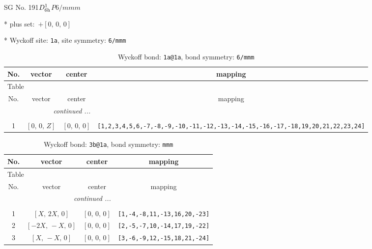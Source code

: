 \documentclass[fleqn,8pt]{jsarticle}
\begin{document}
\setcounter{MaxMatrixCols}{32}

\renewcommand{\tablename}{Table~}
\renewcommand{\figurename}{Figure~}
\begin{center}
\LARGE
SG No. 191\quad$D_{\rm 6h}^{1}$\quad$P6/mmm$\quad[ hexagonal ]
\end{center}

* plus set:\,\,\,$+\left[ 0,\, 0,\, 0 \right]$


* Wyckoff site: {\tt 1a}, site symmetry: {\tt 6/mmm}
\renewcommand{\arraystretch}{1.2}
\begin{longtable}{cccc}
\caption{Wyckoff bond: {\tt 1a@1a}, bond symmetry: {\tt 6/mmm}}
 \\
 \hline \hline
No. & vector & center & mapping \\ \hline \endfirsthead

\multicolumn{3}{l}{\tablename\ \thetable{}} \\
 \hline \hline
No. & vector & center & mapping \\ \hline \endhead

 \hline \hline
\multicolumn{3}{r}{\footnotesize\it continued ...} \\ \endfoot

 \hline \hline
\multicolumn{3}{r}{} \\ \endlastfoot

1 & $\left[ 0,\, 0,\, Z \right]$ & $\left[ 0,\, 0,\, 0 \right]$ & {\tt [1,2,3,4,5,6,-7,-8,-9,-10,-11,-12,-13,-14,-15,-16,-17,-18,19,20,21,22,23,24]} \\
\end{longtable}
\renewcommand{\arraystretch}{1.2}
\begin{longtable}{cccc}
\caption{Wyckoff bond: {\tt 3b@1a}, bond symmetry: {\tt mmm}}
 \\
 \hline \hline
No. & vector & center & mapping \\ \hline \endfirsthead

\multicolumn{3}{l}{\tablename\ \thetable{}} \\
 \hline \hline
No. & vector & center & mapping \\ \hline \endhead

 \hline \hline
\multicolumn{3}{r}{\footnotesize\it continued ...} \\ \endfoot

 \hline \hline
\multicolumn{3}{r}{} \\ \endlastfoot

1 & $\left[ X,\, 2 X,\, 0 \right]$ & $\left[ 0,\, 0,\, 0 \right]$ & {\tt [1,-4,-8,11,-13,16,20,-23]} \\ \hline
2 & $\left[ - 2 X,\, - X,\, 0 \right]$ & $\left[ 0,\, 0,\, 0 \right]$ & {\tt [2,-5,-7,10,-14,17,19,-22]} \\ \hline
3 & $\left[ X,\, - X,\, 0 \right]$ & $\left[ 0,\, 0,\, 0 \right]$ & {\tt [3,-6,-9,12,-15,18,21,-24]} \\
\end{longtable}
\end{document}

